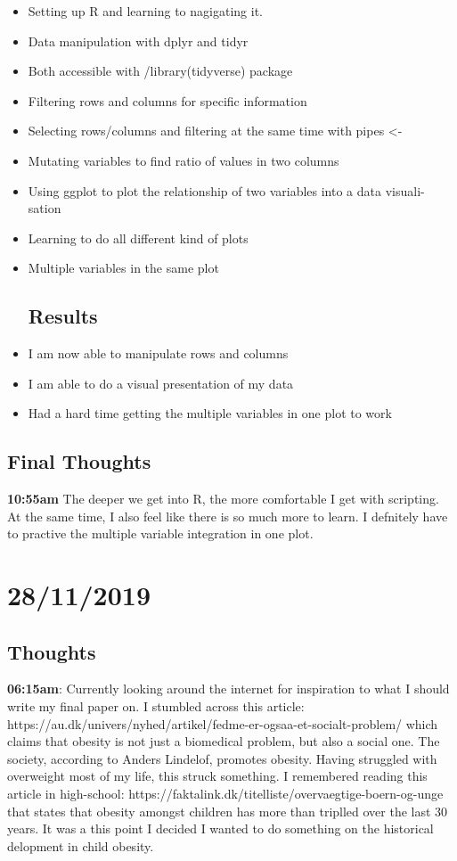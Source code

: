 \documentclass{article}
\begin{document}
\begin{itemize}
\item Setting up R and learning to nagigating it.
\item Data manipulation with dplyr and tidyr 
\item Both accessible with /library(tidyverse) package 
\item Filtering rows and columns for specific information 
\item Selecting rows/columns and filtering at the same time with pipes <-  
\item Mutating variables to find ratio of values in two columns 
\item Using ggplot to plot the relationship of two variables into a data visuali-sation 
\item Learning to do all different kind of plots
\item Multiple variables in the same plot  

\subsection{Results}
\item I am now able to manipulate rows and columns
\item I am able to do a visual presentation of my data
\item Had a hard time getting the multiple variables in one plot to work

\end{itemize}

\subsection{Final Thoughts}
\textbf{10:55am} The deeper we get into R, the more comfortable I get with scripting. At the same time, I also feel like there is so much more to learn. I defnitely have to practive the multiple variable integration in one plot.


\section{28/11/2019}
\subsection{Thoughts}
\textbf{06:15am}: Currently looking around the internet for inspiration to what I should write my final paper on. I stumbled across this article: https://au.dk/univers/nyhed/artikel/fedme-er-ogsaa-et-socialt-problem/ which claims that obesity is not just a biomedical problem, but also a social one. The society, according to Anders Lindelof, promotes obesity. Having struggled with overweight most of my life, this struck something. I remembered reading this article in high-school: https://faktalink.dk/titelliste/overvaegtige-boern-og-unge that states that obesity amongst children has more than triplled over the last 30 years. It was a this point I decided I wanted to do something on the historical delopment in child obesity.
\end{document}
